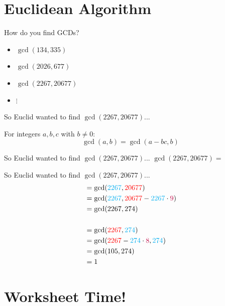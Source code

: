 \documentclass[aspectratio=169,xcolor=dvipsnames]{beamer}
\begin{document}
\section{Euclidean Algorithm}

\begin{frame}[t]{How do you find GCDs?}
    \begin{itemize}
        \item $\gcd(134, 335)$
        \item $\gcd(2026, 677)$
        \item $\gcd(2267, 20677)$
        \item $\vdots$
    \end{itemize}
\end{frame}

\begin{frame}[t]{So Euclid wanted to find $\gcd(2267,20677)$...}
    \begin{theorem}
        For integers $a,b,c$ with $b\neq0$:
        {\Huge$$ \gcd(a,b)=\gcd(a-bc,b)$$}
        \vspace{0.3cm}
    \end{theorem}
    
\end{frame}
\begin{frame}[t]{So Euclid wanted to find $\gcd(2267,20677)$...}
    $\gcd(2267,20677)=$
    
\end{frame}
\begin{frame}[t]{So Euclid wanted to find $\gcd(2267,20677)$...}
    \begin{align*}&=\gcd({\color{cyan}2267},{\color{red}20677})\\&=\gcd({\color{cyan}2267},{\color{red}20677}-{\color{cyan}2267}\cdot{\color{purple}9})\\
    &=\gcd(2267,274)\\
    \\
    &=\gcd({\color{red}2267},{\color{cyan}274})\\
    &=\gcd({\color{red}2267}-{\color{cyan}274}\cdot{\color{purple}8},{\color{cyan}274})\\
    &=\gcd(105,274)\\
    &=1
    \end{align*}
    
\end{frame}

\section{Worksheet Time!}
\end{document}
